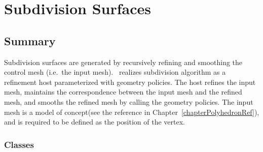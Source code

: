 
\chapter{Subdivision Surfaces}
\label{chapterSubdivisionRef}


\section*{Summary}

Subdivision surfaces are generated by recursively refining and smoothing 
the control mesh (i.e.~the input mesh). \ 
realizes subdivision algorithm as a refinement host parameterized 
with geometry policies. The host refines the input mesh, maintains
the correspondence between the input mesh and the refined mesh, and
smooths the refined mesh by calling the geometry policies.
The input mesh is a model of  concept(see the reference in 
Chapter~\ref{chapterPolyhedronRef}), and \ccc{Point_3} is required to be
defined as the position of the vertex.


\subsection*{Classes}

\\ 
\\ 
\\ 
\\ 
\\ 
\\ 
\\ 
\\ 

